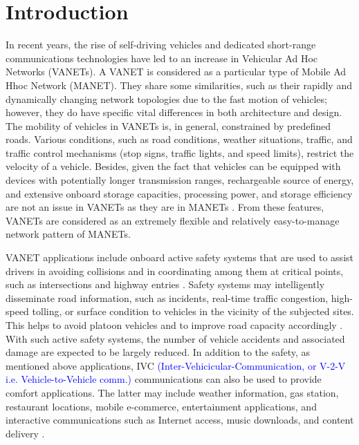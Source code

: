 \documentclass[10pt,journal,letterpaper]{IEEEtran}
\begin{document}
\section{Introduction}
In recent years, the rise of self-driving vehicles and dedicated
short-range communications technologies have led to an increase in
Vehicular Ad Hoc Networks (VANETs). A VANET is considered as a
particular type of Mobile Ad Hhoc Network (MANET). They share some
similarities, such as their rapidly and dynamically changing network
topologies due to the fast motion of vehicles; however, they do have
specific vital differences in both architecture and design\textcolor{blue}{\cite{r16}}. The mobility of
vehicles in VANETs is, in general, constrained by predefined roads.
Various conditions, such as road conditions, weather situations,
traffic, and traffic control mechanisms (stop signs, traffic lights,
and speed limits), restrict the velocity of a vehicle. Besides,
given the fact that vehicles can be equipped with devices with
potentially longer transmission ranges, rechargeable source of
energy, and extensive onboard storage capacities, processing power,
and storage efficiency are not an issue in VANETs as they are in
MANETs\textcolor{blue}{ \cite{r16}} . From
these features, VANETs are considered as an extremely flexible and
relatively easy-to-manage network pattern of MANETs.

VANET applications include onboard active safety systems that are
used to assist drivers in avoiding collisions and in coordinating
among them at critical points, such as intersections and highway
entries \textcolor{blue}{\cite{r17}}.
Safety systems may intelligently disseminate road information, such
as incidents, real-time traffic congestion, high-speed tolling, or
surface condition to vehicles in the vicinity of the subjected
sites. This helps to avoid platoon vehicles and to improve road
capacity accordingly \textcolor{blue}{\cite{r17}}. With such active safety systems, the number of vehicle
accidents and associated damage are expected to be largely reduced.
In addition to the safety, as mentioned above applications, IVC
\textcolor{blue}{(Inter-Vehicicular-Communication, or V-2-V i.e. Vehicle-to-Vehicle comm.)\cite{r18}} communications can also be used to
provide comfort applications. The latter may include weather
information, gas station, restaurant locations, mobile e-commerce,
entertainment applications, and interactive communications such as
Internet access, music downloads, and content delivery \cite{r15}.
\end{document}

